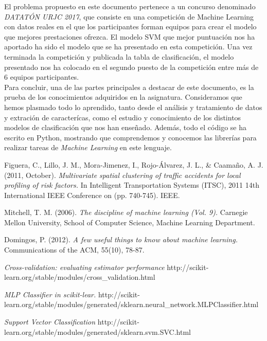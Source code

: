 \documentclass[journal,twoside]{JoPhA}
\begin{document}
El problema propuesto en este documento pertenece a un concurso denominado \emph{DATATÓN URJC 2017}, que consiste en una competición de Machine Learning con datos reales en el que los participantes forman equipos para crear el modelo que mejores prestaciones ofrezca. El modelo SVM que mejor puntuación nos ha aportado ha sido el modelo que se ha presentado en esta competición. Una vez terminada la competición y publicada la tabla de clasificación, el modelo presentado nos ha colocado en el segundo puesto de la competición entre más de 6 equipos participantes.\\

Para concluir, una de las partes principales a destacar de este documento, es la prueba de los conocimientos adquiridos en la asignatura. Consideramos que hemos plasmado todo lo aprendido, tanto desde el análisis y tratamiento de datos y extración de caracterícas, como el estudio y conocimiento de los distintos modelos de clasificación que nos han enseñado. Además, todo el código se ha escrito en Python, mostrando que comprendemos y conocemos las librerías para realizar tareas de \textit{Machine Learning} en este lenguaje.

\begin{thebibliography}{1}

Figuera, C., Lillo, J. M., Mora-Jimenez, I., Rojo-Álvarez, J. L., \& Caamaño, A. J. (2011, October). \emph{Multivariate spatial clustering of traffic accidents for local profiling of risk factors.} In Intelligent Transportation Systems (ITSC), 2011 14th International IEEE Conference on (pp. 740-745). IEEE.

Mitchell, T. M. (2006). \emph{The discipline of machine learning (Vol. 9).} Carnegie Mellon University, School of Computer Science, Machine Learning Department.

Domingos, P. (2012). \emph{A few useful things to know about machine learning.} Communications of the ACM, 55(10), 78-87.

\emph{Cross-validation: evaluating estimator performance} http://scikit-learn.org/stable/modules/cross\_validation.html

\emph{MLP Classifier in scikit-lear.}
http://scikit-learn.org/stable/modules/generated/sklearn.neural\_network.MLPClassifier.html

\emph{Support Vector Classification}
http://scikit-learn.org/stable/modules/generated/sklearn.svm.SVC.html

\end{thebibliography}
\end{document}
